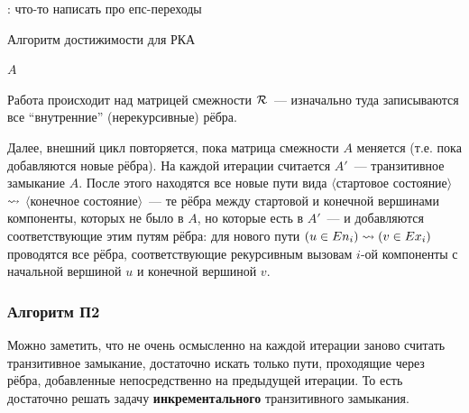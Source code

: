     \TODO: что-то написать про епс-переходы

    \begin{algorithm}[H]
        \begin{algorithmic}[1]
        \caption{Алгоритм достижимости для РКА}
        \label{algo:P}
                            \EndIf
                        \EndFor
                   \EndFor
                \EndFor
            \EndWhile
        \State \Return $A$
        \EndFunction
        \end{algorithmic}
    \end{algorithm}

    Работа происходит над матрицей смежности $\mathcal{R}$~--- изначально туда записываются все ``внутренние'' (нерекурсивные) рёбра. 

    Далее, внешний цикл повторяется, пока матрица смежности $A$ меняется (т.е. пока добавляются новые рёбра). На каждой итерации считается $A'$~--- транзитивное замыкание $A$. После этого находятся все новые пути вида $\langle$стартовое состояние$\rangle$ $\rightsquigarrow$ $\langle$конечное состояние$\rangle$~--- те рёбра между стартовой и конечной вершинами компоненты, которых не было в $A$, но которые есть в $A'$~--- и добавляются соответствующие этим путям рёбра: для нового пути $(u \in En_i) \rightsquigarrow (v \in Ex_i)$ проводятся все рёбра, соответствующие рекурсивным вызовам $i$-ой компоненты с начальной вершиной $u$ и конечной вершиной $v$.

\subsubsection{Алгоритм П2}

    Можно заметить, что не очень осмысленно на каждой итерации заново считать транзитивное замыкание, достаточно искать только пути, проходящие через рёбра, добавленные непосредственно на предыдущей итерации. То есть достаточно решать задачу {\bf инкрементального} транзитивного замыкания. 

